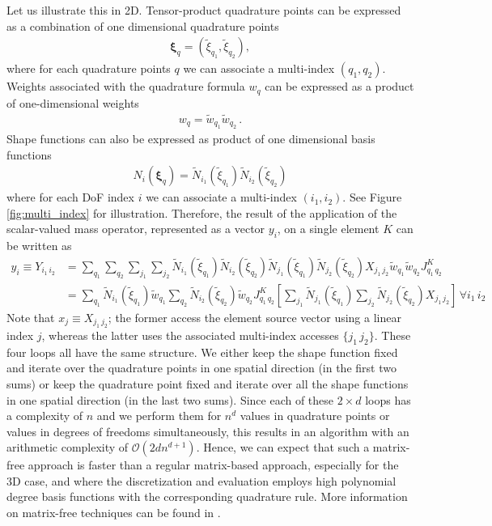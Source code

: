 \documentclass[preprint,12pt,times]{elsarticle}
\def\gz  #1{           \mbox{$\boldsymbol{#1}$}}
\begin{document}
Let us illustrate this in 2D. Tensor-product quadrature points can be expressed as a combination of one dimensional quadrature points
\begin{align}
  \gz \xi_q = (\widetilde{\xi}_{q_1}, \widetilde{\xi}_{q_2}),
\end{align}
where for each quadrature points $q$ we can associate a multi-index $(q_1,q_2)$.
Weights associated with the quadrature formula $w_q$ can be expressed as a product of one-dimensional weights
\begin{align}
  w_q = \widetilde{w}_{q_1} \widetilde{w}_{q_2} \, .
\end{align}
Shape functions can also be expressed as product of one dimensional basis functions
\begin{align}
  N_i(\gz \xi_q) =
  \widetilde{N}_{i_1}(\widetilde{\xi}_{q_1})
  \widetilde{N}_{i_2}(\widetilde{\xi}_{q_2})
\end{align}
where for each DoF index $i$ we can associate a multi-index $(i_1, i_2)$.
{\color{red}
See Figure \ref{fig:multi_index} for illustration.
}
%
Therefore, the result of the application of the scalar-valued mass operator, represented as a vector $y_i$, on a single element $K$ can be written as
\begin{align*}
  y_{i} \equiv Y_{i_1\,i_2} & = \sum_{q_1} \sum_{q_2} \sum_{j_1} \sum_{j_2}
  \widetilde{N}_{i_1}(\widetilde{\xi}_{q_1})
  \widetilde{N}_{i_2}(\widetilde{\xi}_{q_2})
  \widetilde{N}_{j_1}(\widetilde{\xi}_{q_1})
  \widetilde{N}_{j_2}(\widetilde{\xi}_{q_2})
  X_{j_1\,j_2}
  \widetilde{w}_{q_1} \widetilde{w}_{q_2} J^K_{q_1\,q_2}
  \\
  &=
  \sum_{q_1} \widetilde{N}_{i_1}(\widetilde{\xi}_{q_1}) \widetilde{w}_{q_1}
  \sum_{q_2} \widetilde{N}_{i_2}(\widetilde{\xi}_{q_2}) \widetilde{w}_{q_2}
  J^K_{q_1\,q_2}
  \left[
    \sum_{j_1}
    \widetilde{N}_{j_1}(\widetilde{\xi}_{q_1})
    \sum_{j_2}
    \widetilde{N}_{j_2}(\widetilde{\xi}_{q_2})
    X_{j_1\,j_2}
  \right]\, \forall i_1 \, i_2
\end{align*}
%
{\color{red}
Note that $x_j \equiv X_{j_1\,j_2}$; the former access the element source vector using a linear index $j$, whereas the latter uses the associated multi-index accesses $\{j_1\,j_2\}$.
}
%
These four loops all have the same structure.
We either keep the shape function fixed and iterate over the quadrature points in one spatial direction (in the first two sums) or keep the quadrature point fixed and iterate over all the shape functions in one spatial direction (in the last two sums).
Since each of these $2\times d$ loops has a complexity of $n$ and we perform them for $n^d$ values in quadrature points or values in degrees of freedoms simultaneously, this results in an algorithm with an arithmetic complexity of $\mathcal{O}(2dn^{d+1})$.
Hence, we can expect that such a matrix-free approach is faster than a regular matrix-based approach, especially for the 3D case, and where the discretization and evaluation employs high polynomial degree basis functions with the corresponding quadrature rule.
More information on matrix-free techniques can be found in \cite{kronbichler12,vos10}.
\end{document}
